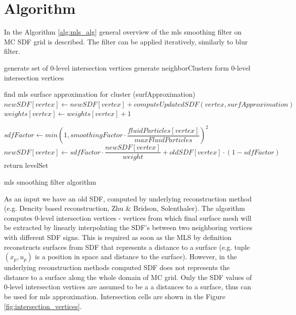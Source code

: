 \section{Algorithm}
In the Algorithm \ref{alg:mls_alg} general overview of the mls smoothing filter on MC SDF grid is described. The filter can be applied iteratively, similarly to blur filter.
\begin{algorithm}[H]
	\scriptsize
	\begin{algorithmic}
		\State generate set of 0-level intersection vertices 
		\State generate neighborClusters form 0-level intersection vertices 
			
			\State find mls surface approximation for cluster (surfApproximation)
				\State $newSDF[vertex] \gets newSDF[vertex] + computeUpdatedSDF(vertex, surfApproximation)$
				\State $weights[vertex] \gets weights[vertex] + 1$
			\EndFor
		\EndFor

			\State $sdfFactor \gets min\left(1, smoothingFactor \cdot \dfrac{fluidParticles[vertex]}{maxFluidParticles}\right)^2$
			\State $newSDF[vertex] \gets sdfFactor \cdot \dfrac{newSDF[vertex]}{weight} + oldSDF[vertex] \cdot (1 - sdfFactor)$
		\EndFor
		\State return levelSet
	\end{algorithmic}
	\caption{mls smoothing filter algorithm}
	\label{alg:mls_alg}
\end{algorithm}
As an input we have an old SDF, computed by underlying reconstruction method (e.g. Dencity based reconstruction, Zhu \& Bridson, Solenthaler). The algorithm computes 0-level intersection vertices - vertices from which final surface mesh will be extracted by linearly interpolating the SDF's between two neighboring vertices with different SDF signs. This is required as soon as the MLS by definition reconstructs surfaces from SDF that represents a distance to a surface (e.g. tuple $(x_p, u_p)$ is a position in space and distance to the surface). However, in the underlying reconstruction methods computed SDF does not represents the distance to a surface along the whole domain of MC grid. Only the SDF values of 0-level intersection vertices are assumed to be a a distances to a surface, thus can be used for mls approximation. Intersection cells are shown in the Figure \ref{fig:intersection_vertices}.\\
